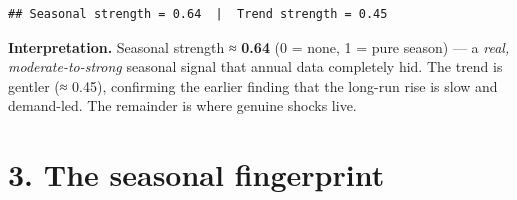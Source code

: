 \documentclass[
]{article}
\newenvironment{Shaded}{\begin{snugshade}}{\end{snugshade}}
\newcommand{\DecValTok}[1]{\textcolor[rgb]{0.00,0.00,0.81}{#1}}
\newcommand{\FunctionTok}[1]{\textcolor[rgb]{0.13,0.29,0.53}{\textbf{#1}}}
\newcommand{\NormalTok}[1]{#1}
\newcommand{\OtherTok}[1]{\textcolor[rgb]{0.56,0.35,0.01}{#1}}
\newcommand{\SpecialCharTok}[1]{\textcolor[rgb]{0.81,0.36,0.00}{\textbf{#1}}}
\newcommand{\StringTok}[1]{\textcolor[rgb]{0.31,0.60,0.02}{#1}}
\begin{document}
\begin{Shaded}
\end{Shaded}

\begin{verbatim}
## Seasonal strength = 0.64  |  Trend strength = 0.45
\end{verbatim}

\textbf{Interpretation.} Seasonal strength ≈ \textbf{0.64} (0 = none, 1
= pure season) --- a \emph{real, moderate-to-strong} seasonal signal
that annual data completely hid. The trend is gentler (≈ 0.45),
confirming the earlier finding that the long-run rise is slow and
demand-led. The remainder is where genuine shocks live.

\section{3. The seasonal fingerprint}\label{the-seasonal-fingerprint}
\end{document}
